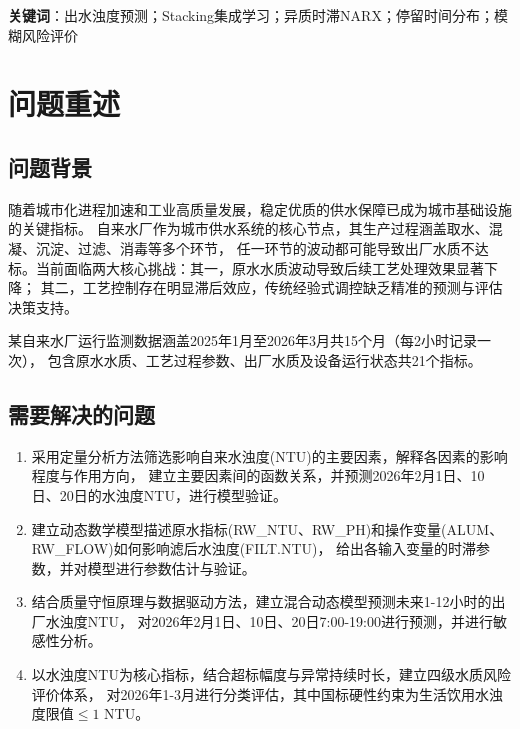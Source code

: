 \documentclass[12pt,a4paper]{ctexart}
\begin{document}
\vspace{0.5em}
\textbf{关键词}：出水浊度预测；Stacking集成学习；异质时滞NARX；停留时间分布；模糊风险评价

\newpage

\section{问题重述}

\subsection{问题背景}

随着城市化进程加速和工业高质量发展，稳定优质的供水保障已成为城市基础设施的关键指标。
自来水厂作为城市供水系统的核心节点，其生产过程涵盖取水、混凝、沉淀、过滤、消毒等多个环节，
任一环节的波动都可能导致出厂水质不达标。当前面临两大核心挑战：其一，原水水质波动导致后续工艺处理效果显著下降；
其二，工艺控制存在明显滞后效应，传统经验式调控缺乏精准的预测与评估决策支持。

某自来水厂运行监测数据涵盖2025年1月至2026年3月共15个月（每2小时记录一次），
包含原水水质、工艺过程参数、出厂水质及设备运行状态共21个指标。

\subsection{需要解决的问题}

\begin{enumerate}[label=\textbf{问题\arabic*：},nosep,leftmargin=4.5em,labelsep=0.5em,itemindent=0pt]
    \item 采用定量分析方法筛选影响自来水浊度(NTU)的主要因素，解释各因素的影响程度与作用方向，
          建立主要因素间的函数关系，并预测2026年2月1日、10日、20日的水浊度NTU，进行模型验证。
    \item 建立动态数学模型描述原水指标(RW\_NTU、RW\_PH)和操作变量(ALUM、RW\_FLOW)如何影响滤后水浊度(FILT.NTU)，
          给出各输入变量的时滞参数，并对模型进行参数估计与验证。
    \item 结合质量守恒原理与数据驱动方法，建立混合动态模型预测未来1-12小时的出厂水浊度NTU，
          对2026年2月1日、10日、20日7:00-19:00进行预测，并进行敏感性分析。
    \item 以水浊度NTU为核心指标，结合超标幅度与异常持续时长，建立四级水质风险评价体系，
          对2026年1-3月进行分类评估，其中国标硬性约束为生活饮用水浊度限值$\leq 1$ NTU。
\end{enumerate}
\end{document}
